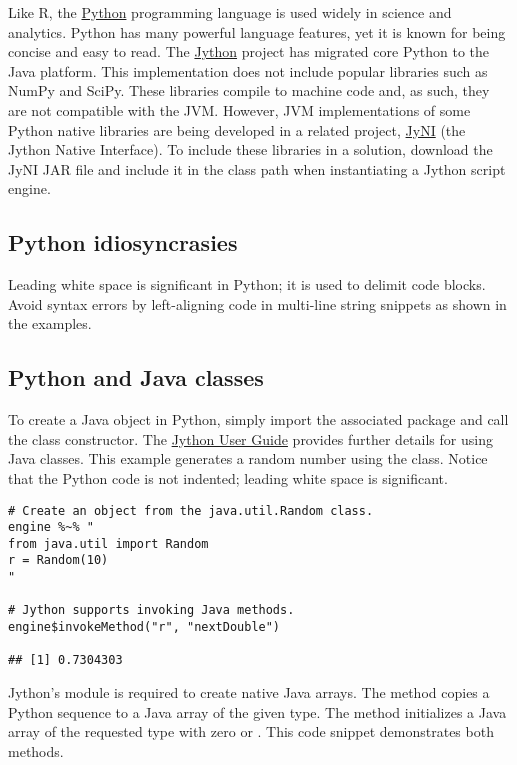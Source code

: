 Like R, the \href{https://www.python.org/}{Python} programming language is used widely in science and analytics. Python has many powerful language features, yet it is known for being concise and easy to read. The \href{http://www.jython.org/}{Jython} project has migrated core Python to the Java platform. This implementation does not include popular libraries such as NumPy and SciPy. These libraries compile to machine code and, as such, they are not compatible with the JVM. However, JVM implementations of some Python native libraries are being developed in a related project, \href{http://www.jyni.org/}{JyNI} (the Jython Native Interface). To include these libraries in a  solution, download the JyNI JAR file and include it in the class path when instantiating a Jython script engine.

\subsection{Python idiosyncrasies}

Leading white space is significant in Python; it is used to delimit code blocks. Avoid syntax errors by left-aligning code in multi-line string snippets as shown in the examples.

\subsection{Python and Java classes}

To create a Java object in Python, simply import the associated package and call the class constructor. The \href{https://wiki.python.org/jython/NewUsersGuide}{Jython User Guide} provides further details for using Java classes. This example generates a random number using the  class. Notice that the Python code is not indented; leading white space is significant.

\begin{verbatim}
# Create an object from the java.util.Random class.
engine %~% "
from java.util import Random
r = Random(10)
"

# Jython supports invoking Java methods.
engine$invokeMethod("r", "nextDouble")

## [1] 0.7304303
\end{verbatim}

Jython's  module is required to create native Java arrays. The  method copies a Python sequence to a Java array of the given type. The  method initializes a Java array of the requested type with zero or . This code snippet demonstrates both methods.


